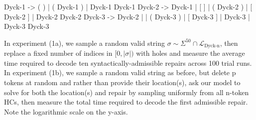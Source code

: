 \documentclass[sigplan,review,anonymous,acmsmall]{acmart}\settopmatter{printfolios=false,printccs=false,printacmref=false}
\begin{document}
  \begin{wholetidyinput}
    Dyck-1 -> ( ) | ( Dyck-1 ) | Dyck-1 Dyck-1
Dyck-2 -> Dyck-1 | [ ] | ( Dyck-2 ) | [ Dyck-2 ] | Dyck-2 Dyck-2
Dyck-3 -> Dyck-2 | { } | ( Dyck-3 ) | [ Dyck-3 ] | { Dyck-3 } | Dyck-3 Dyck-3
  \end{wholetidyinput}

  \noindent In experiment (1a), we sample a random valid string $\sigma \sim \Sigma^{50} \cap \mathcal{L}_{\text{Dyck-n}}$, then replace a fixed number of indices in $[0, |\sigma|)$ with holes and measure the average time required to decode ten syntactically-admissible repairs across 100 trial runs. In experiment (1b), we sample a random valid string as before, but delete p tokens at random and rather than provide their location(s), ask our model to solve for both the location(s) and repair by sampling uniformly from all n-token HCs, then measure the total time required to decode the first admissible repair. Note the logarithmic scale on the y-axis.
\end{document}

